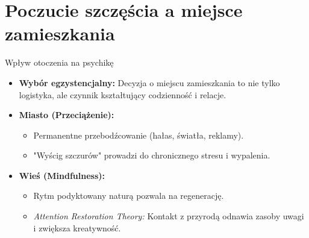\section{Poczucie szczęścia a miejsce zamieszkania}

\begin{frame}{Wpływ otoczenia na psychikę}
    \begin{itemize}
        \item \textbf{Wybór egzystencjalny:} Decyzja o miejscu zamieszkania to nie tylko logistyka, ale czynnik kształtujący codzienność i relacje.
        \item \textbf{Miasto (Przeciążenie):}
        \begin{itemize}
            \item Permanentne przebodźcowanie (hałas, światła, reklamy).
            \item "Wyścig szczurów" prowadzi do chronicznego stresu i wypalenia.
        \end{itemize}
        \item \textbf{Wieś (Mindfulness):}
        \begin{itemize}
            \item Rytm podyktowany naturą pozwala na regenerację.
            \item \textit{Attention Restoration Theory:} Kontakt z przyrodą odnawia zasoby uwagi i zwiększa kreatywność.
        \end{itemize}
    \end{itemize}
\end{frame}

